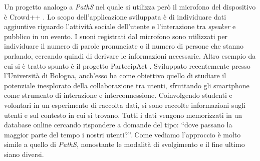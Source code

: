 Un progetto analogo a \emph{PathS} nel quale si utilizza però il microfono del dispositivo è Crowd++ \cite{crowdplusplus}. Lo scopo dell'applicazione sviluppata è di individuare dati aggiuntive riguardo l'attività sociale dell'utente e l'interazione tra \emph{speaker} e pubblico in un evento. I suoni registrati dal microfono sono utilizzati per individuare il numero di parole pronunciate o il numero di persone che stanno parlando, cercando quindi di derivare le informazioni necessarie.
Altro esempio da cui si è tratto spunto è il progetto PartecipAct \cite{participact}. Sviluppato recentemente presso l'Università di Bologna, anch'esso ha come obiettivo quello di studiare il potenziale inesplorato della collaborazione tra utenti, sfruttando gli smartphone come strumento di interazione e interconnessione. Coinvolgendo studenti e volontari in un esperimento di raccolta dati, si sono raccolte informazioni sugli utenti e sul contesto in cui si trovano. Tutti i dati vengono memorizzati in un database online cercando rispondere a domande del tipo: ``dove passano la maggior parte del tempo i nostri utenti?''. Come vediamo l'approccio è molto simile a quello di \emph{PathS}, nonostante le modalità di svolgimento e il fine ultimo siano diversi.
